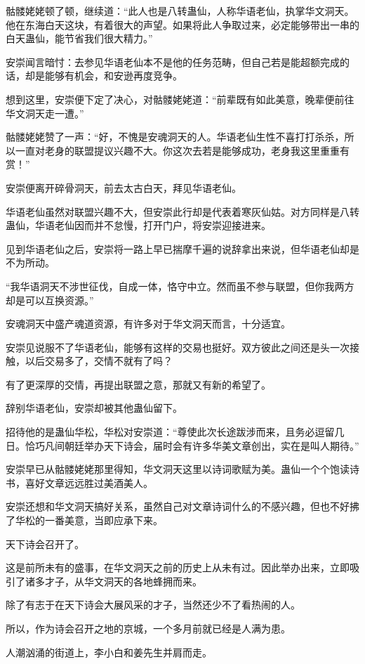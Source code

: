 \begin{this_body}
骷髅姥姥顿了顿，继续道：“此人也是八转蛊仙，人称华语老仙，执掌华文洞天。他在东海白天这块，有着很大的声望。如果将此人争取过来，必定能够带出一串的白天蛊仙，能节省我们很大精力。”

安崇闻言暗忖：去参见华语老仙本不是他的任务范畴，但自己若是能超额完成的话，却是能够有机会，和安逊再度竞争。

想到这里，安崇便下定了决心，对骷髅姥姥道：“前辈既有如此美意，晚辈便前往华文洞天走一遭。”

骷髅姥姥赞了一声：“好，不愧是安魂洞天的人。华语老仙生性不喜打打杀杀，所以一直对老身的联盟提议兴趣不大。你这次去若是能够成功，老身我这里重重有赏！”

安崇便离开碎骨洞天，前去太古白天，拜见华语老仙。

华语老仙虽然对联盟兴趣不大，但安崇此行却是代表着寒灰仙姑。对方同样是八转蛊仙，华语老仙因而并不怠慢，打开门户，将安崇迎接进来。

见到华语老仙之后，安崇将一路上早已揣摩千遍的说辞拿出来说，但华语老仙却是不为所动。

“我华语洞天不涉世征伐，自成一体，恪守中立。然而虽不参与联盟，但你我两方却是可以互换资源。”

安魂洞天中盛产魂道资源，有许多对于华文洞天而言，十分适宜。

安崇见说服不了华语老仙，能够有这样的交易也挺好。双方彼此之间还是头一次接触，以后交易多了，交情不就有了吗？

有了更深厚的交情，再提出联盟之意，那就又有新的希望了。

辞别华语老仙，安崇却被其他蛊仙留下。

招待他的是蛊仙华松，华松对安崇道：“尊使此次长途跋涉而来，且务必逗留几日。恰巧凡间朝廷举办天下诗会，届时会有许多华美文章创出，实在是叫人期待。”

安崇早已从骷髅姥姥那里得知，华文洞天这里以诗词歌赋为美。蛊仙一个个饱读诗书，喜好文章远远胜过美酒美人。

安崇还想和华文洞天搞好关系，虽然自己对文章诗词什么的不感兴趣，但也不好拂了华松的一番美意，当即应承下来。

天下诗会召开了。

这是前所未有的盛事，在华文洞天之前的历史上从未有过。因此举办出来，立即吸引了诸多才子，从华文洞天的各地蜂拥而来。

除了有志于在天下诗会大展风采的才子，当然还少不了看热闹的人。

所以，作为诗会召开之地的京城，一个多月前就已经是人满为患。

人潮汹涌的街道上，李小白和姜先生并肩而走。


\end{this_body}
